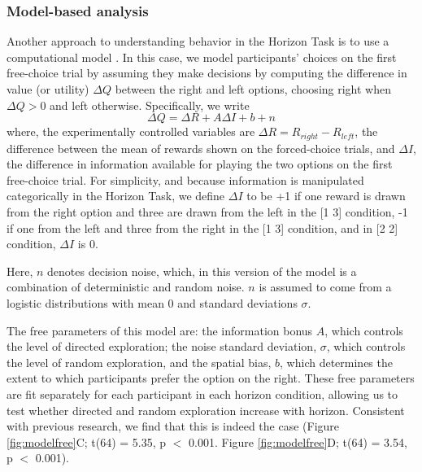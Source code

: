 \documentclass[12pt]{article}
\begin{document}
{	\subsubsection*{Model-based analysis}	
	Another approach to understanding behavior in the Horizon Task is to use a computational model \citep{wilson2014}. In this case, we model  participants' choices on the first free-choice trial by assuming they make decisions by computing the difference in value (or utility) $\Delta Q$ between the right and left options, choosing right when $\Delta Q > 0$ and left otherwise.  Specifically, we write
	\begin{equation}
		\label{eq:origmodel}
		\Delta Q= \Delta R+A \Delta I+b+n
	\end{equation}
	where, the experimentally controlled variables are $\Delta R=R_{right}-R_{left}$, the difference between the mean of rewards shown on the forced-choice trials, and $\Delta I$, the difference in information available for playing the two options on the first free-choice trial. For simplicity, and because information is manipulated categorically in the Horizon Task, we define $\Delta I$ to be +1 if one reward is drawn from the right option and three are drawn from the left in the [1 3] condition, -1 if one from the left and three from the right in the [1 3] condition, and in [2 2] condition, $\Delta I$ is 0. 
	
	Here, $n$ denotes decision noise, which, in this version of the model is a combination of deterministic and random noise. $n$ is assumed to come from a logistic distributions with mean 0 and standard deviations $\sigma$.
	
	The free parameters of this model are: the information bonus $A$, which controls the level of directed exploration; the noise standard deviation, $\sigma$, which controls the level of random exploration, and the spatial bias, $b$, which determines the extent to which participants prefer the option on the right. These free parameters are fit separately for each participant in each horizon condition, allowing us to test whether directed and random exploration increase with horizon. Consistent with previous research, we find that this is indeed the case (Figure \ref{fig:modelfree}C; t(64) = 5.35, p $<$ 0.001. Figure \ref{fig:modelfree}D; t(64) = 3.54, p $<$ 0.001). 
	
}
\end{document}
